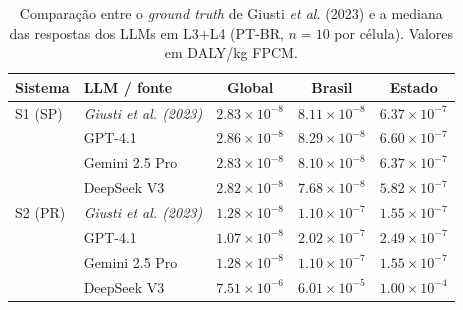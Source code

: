 \begin{table}[h]
\centering
\footnotesize
\caption{Comparação entre o \emph{ground truth} de Giusti \emph{et al.} (2023) e a mediana das respostas dos LLMs em L3+L4 (PT-BR, $n=10$ por célula). Valores em DALY/kg FPCM.}
\label{tab:sm_comparative}
\begin{tabular}{l l c c c}
\toprule
\textbf{Sistema} & \textbf{LLM / fonte} & \textbf{Global} & \textbf{Brasil} & \textbf{Estado} \\
\midrule
S1 (SP) & \textit{Giusti et al. (2023)} & $2.83 \times 10^{-8}$ & $8.11 \times 10^{-8}$ & $6.37 \times 10^{-7}$ \\
 & GPT-4.1 & $2.86 \times 10^{-8}$ & $8.29 \times 10^{-8}$ & $6.60 \times 10^{-7}$ \\
 & Gemini 2.5 Pro & $2.83 \times 10^{-8}$ & $8.10 \times 10^{-8}$ & $6.37 \times 10^{-7}$ \\
 & DeepSeek V3 & $2.82 \times 10^{-8}$ & $7.68 \times 10^{-8}$ & $5.82 \times 10^{-7}$ \\
\midrule
S2 (PR) & \textit{Giusti et al. (2023)} & $1.28 \times 10^{-8}$ & $1.10 \times 10^{-7}$ & $1.55 \times 10^{-7}$ \\
 & GPT-4.1 & $1.07 \times 10^{-8}$ & $2.02 \times 10^{-7}$ & $2.49 \times 10^{-7}$ \\
 & Gemini 2.5 Pro & $1.28 \times 10^{-8}$ & $1.10 \times 10^{-7}$ & $1.55 \times 10^{-7}$ \\
 & DeepSeek V3 & $7.51 \times 10^{-6}$ & $6.01 \times 10^{-5}$ & $1.00 \times 10^{-4}$ \\
\bottomrule
\end{tabular}
\end{table}